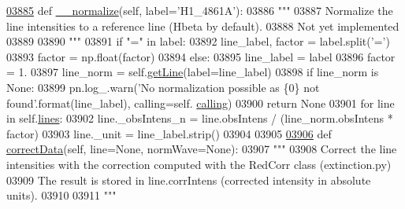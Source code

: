 \begin{DoxyCode}
{{{{{{{{{{{{{{{{{{{{{{\hypertarget{pynebcore_8py_source_l03885}{}\hyperlink{classpyneb_1_1core_1_1pynebcore_1_1_observation_a04ce20073b375a6dd7d4282933adbd93}{03885}     \textcolor{keyword}{def }\hyperlink{classpyneb_1_1core_1_1pynebcore_1_1_observation_a04ce20073b375a6dd7d4282933adbd93}{\_\_normalize}(self, label='H1\_4861A'):
03886         \textcolor{stringliteral}{"""}
03887 \textcolor{stringliteral}{        Normalize the line intensities to a reference line (Hbeta by default).}
03888 \textcolor{stringliteral}{        Not yet implemented}
03889 \textcolor{stringliteral}{        }
03890 \textcolor{stringliteral}{        """}
03891         \textcolor{keywordflow}{if} \textcolor{stringliteral}{"="} \textcolor{keywordflow}{in} label:
03892             line\_label, factor = label.split(\textcolor{stringliteral}{'='})
03893             factor = np.float(factor)
03894         \textcolor{keywordflow}{else}:
03895             line\_label = label
03896             factor = 1.
03897         line\_norm = self.\hyperlink{classpyneb_1_1core_1_1pynebcore_1_1_observation_a9994c84a500a6a31a5376ed6c7782ce3}{getLine}(label=line\_label) 
03898         \textcolor{keywordflow}{if} line\_norm \textcolor{keywordflow}{is} \textcolor{keywordtype}{None}:
03899             pn.log\_.warn(\textcolor{stringliteral}{'No normalization possible as \{0\} not found'}.format(line\_label), calling=self.
      \hyperlink{classpyneb_1_1core_1_1pynebcore_1_1_observation_a2639fad9af4fefad20e4097295bd40e7}{calling})
03900             \textcolor{keywordflow}{return} \textcolor{keywordtype}{None}
03901         \textcolor{keywordflow}{for} line \textcolor{keywordflow}{in} self.\hyperlink{classpyneb_1_1core_1_1pynebcore_1_1_observation_a78332043ca9f290590edf6b8a1e5b767}{lines}:
03902             line.\_obsIntens\_n = line.obsIntens / (line\_norm.obsIntens * factor)
03903             line.\_unit = line\_label.strip()
03904     
03905     
\hypertarget{pynebcore_8py_source_l03906}{}\hyperlink{classpyneb_1_1core_1_1pynebcore_1_1_observation_a823a1fa51f042f2734cbc323c6a7d4bb}{03906}     \textcolor{keyword}{def }\hyperlink{classpyneb_1_1core_1_1pynebcore_1_1_observation_a823a1fa51f042f2734cbc323c6a7d4bb}{correctData}(self, line=None, normWave=None):
03907         \textcolor{stringliteral}{"""}
03908 \textcolor{stringliteral}{        Correct the line intensities with the correction computed with the RedCorr class (extinction.py)}
03909 \textcolor{stringliteral}{        The result is stored in line.corrIntens (corrected intensity in absolute units).}
03910 \textcolor{stringliteral}{}
03911 \textcolor{stringliteral}{        """}
}}}}}}}}}}}}}}}}}}}}}}
\end{DoxyCode}
